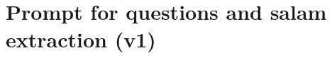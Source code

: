 \appendix




     
   
\chapter{Prompt for questions and salam extraction (v1)}
\label{appex:prompt_for_extraction_v1}

